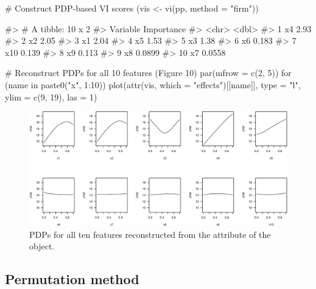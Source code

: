 \begin{Schunk}
\begin{Sinput}
# Construct PDP-based VI scores
(vis <- vi(pp, method = "firm"))
\end{Sinput}
\begin{Soutput}
#> # A tibble: 10 x 2
#>    Variable Importance
#>    <chr>         <dbl>
#>  1 x4           2.93
#>  2 x2           2.05
#>  3 x1           2.04
#>  4 x5           1.53
#>  5 x3           1.38
#>  6 x6           0.183
#>  7 x10          0.139
#>  8 x9           0.113
#>  9 x8           0.0899
#> 10 x7           0.0558
\end{Soutput}
\begin{Sinput}
# Reconstruct PDPs for all 10 features (Figure 10)
par(mfrow = c(2, 5))
for (name in paste0("x", 1:10)) {
  plot(attr(vis, which = "effects")[[name]], type = "l", ylim = c(9, 19), las = 1)
}
\end{Sinput}
\begin{figure}[!htb]

{\centering \includegraphics[width=1\linewidth]{greenwell-boehmke_files/figure-latex/pdp-from-attr-1}

}

\caption[PDPs for all ten features reconstructed from the  attribute of the  object]{PDPs for all ten features reconstructed from the  attribute of the  object.}\label{fig:pdp-from-attr}
\end{figure}
\end{Schunk}

\subsection{Permutation method}


